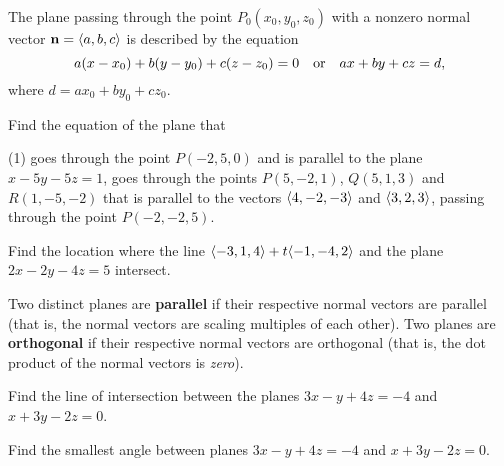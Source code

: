 \documentclass[mathNotesPreamble]{subfiles}
\begin{document}
  \begin{thmBox*}
    The plane passing through the point $P_0(x_0,y_0,z_0)$ with a nonzero normal vector \newline${\mathbf{n}}={\left\langle a,b,c \right\rangle}$ is described by the equation
      \[a{\left(x-x_0\right)}+b{\left(y-y_0\right)}+c{\left(z-z_0\right)}=0\quad\textnormal{or}\quad ax+by+cz=d,\]
    where $d=ax_0+by_0+cz_0$.
  \end{thmBox*}
  \pagebreak

  \begin{ex*}
    Find the equation of the plane that
    \begin{tasks}[after-item-skip=\stretch{1}, label=\textbullet](1)
      \task goes through the point $P(-2,5,0)$ and is parallel to the plane $x-5y-5z=1$,
      \task goes through the points $P(5,-2,1)$, $Q(5,1,3)$ and $R(1,-5,-2)$
      \task that is parallel to the vectors ${\left\langle 4,-2,-3 \right\rangle}$ and ${\left\langle 3,2,3 \right\rangle}$, passing through the point $P(-2,-2,5)$.
    \end{tasks}
  \end{ex*}
  \pagebreak

  \begin{ex*}
    Find the location where the line ${\left\langle -3,1,4 \right\rangle}+t{\left\langle -1,-4,2 \right\rangle}$ and the plane $2x-2y-4z=5$ intersect.
  \end{ex*}

  \begin{defn*}
    Two distinct planes are \textbf{parallel} if their respective normal vectors are parallel (that is, the normal vectors are scaling multiples of each other). Two planes are \textbf{orthogonal} if their respective normal vectors are orthogonal (that is, the dot product of the normal vectors is \textit{zero}).
  \end{defn*}
  \begin{ex*}
    Find the line of intersection between the planes $3x-y+4z=-4$ and $x+3y-2z=0$.
  \end{ex*}
  \pagebreak

  \begin{ex*}
    Find the smallest angle between planes $3x-y+4z=-4$ and $x+3y-2z=0$.
  \end{ex*}

  \pagebreak
  
\end{document}
